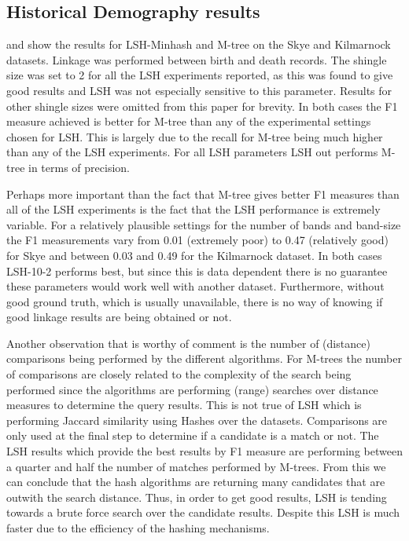 \documentclass{llncs}
\begin{document}
\subsection{Historical Demography results}

 and  show the results for LSH-Minhash and M-tree on the Skye and Kilmarnock datasets. Linkage was performed between birth and death records. The shingle size was set to 2 for all the LSH experiments reported, as this was found to give good results and LSH was not especially sensitive to this parameter. Results for other shingle sizes were omitted from this paper for brevity. In both cases the F1 measure achieved is better for M-tree than any of the experimental settings chosen for LSH. This is largely due to the recall for M-tree being much higher than any of the LSH experiments. For all LSH parameters LSH out performs M-tree in terms of precision.

Perhaps more important than the fact that M-tree gives better F1 measures than all of the LSH experiments is the fact that the LSH performance is extremely variable. For a relatively plausible settings for the number of bands and band-size the F1 measurements vary from 0.01 (extremely poor) to 0.47 (relatively good) for Skye and between 0.03 and 0.49 for the Kilmarnock dataset. In both cases LSH-10-2 performs best, but since this is data dependent there is no guarantee these parameters would work well with another dataset. Furthermore, without good ground truth, which is usually unavailable, there is no way of knowing if good linkage results are being obtained or not.

Another observation that is worthy of comment is the number of (distance) comparisons being performed by the different algorithms. For M-trees the number of comparisons are closely related to the complexity of the search being performed since the algorithms are performing (range) searches over distance measures to determine the query results. This is not true of LSH which is performing Jaccard similarity using Hashes over the datasets. Comparisons are only used at the final step to determine if a candidate is a match or not. The LSH results which provide the best results by F1 measure are performing between a quarter and half the number of matches performed by M-trees. From this we can conclude that the hash algorithms are returning many candidates that are outwith the search distance. Thus, in order to get good results, LSH is tending towards a brute force search over the candidate results. Despite this LSH is much faster due to the efficiency of the hashing mechanisms.
\end{document}
